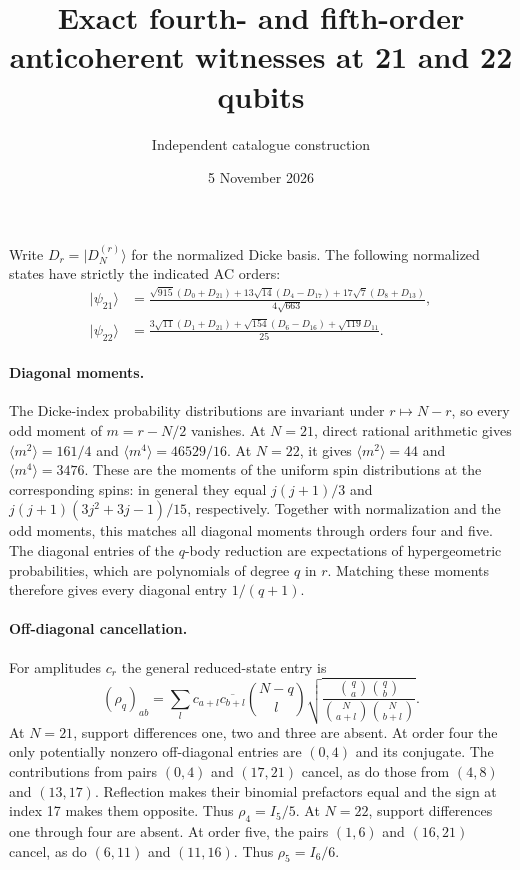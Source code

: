 \documentclass[11pt]{article}
\begin{document}
\title{Exact fourth- and fifth-order anticoherent witnesses at 21 and 22 qubits}
\author{Independent catalogue construction}
\date{5 November 2026}
\maketitle
Write $D_r=|D_N^{(r)}\rangle$ for the normalized Dicke basis.
The following normalized states have strictly the indicated AC orders:
\begin{align*}
|\psi_{21}\rangle&=\frac{\sqrt{915}(D_0+D_{21})+
 13\sqrt{14}(D_4-D_{17})+17\sqrt7(D_8+D_{13})}{4\sqrt{663}},\\
|\psi_{22}\rangle&=\frac{3\sqrt{11}(D_1+D_{21})+
 \sqrt{154}(D_6-D_{16})+\sqrt{119}D_{11}}{25}.
\end{align*}

\paragraph{Diagonal moments.}
The Dicke-index probability distributions are invariant under $r\mapsto N-r$,
so every odd moment of $m=r-N/2$ vanishes. At $N=21$, direct rational arithmetic
gives $\langle m^2\rangle=161/4$ and
$\langle m^4\rangle=46529/16$. At $N=22$, it gives
$\langle m^2\rangle=44$ and $\langle m^4\rangle=3476$.
These are the moments of the uniform spin distributions at the corresponding
spins: in general they equal $j(j+1)/3$ and
$j(j+1)(3j^2+3j-1)/15$, respectively. Together with normalization and the odd
moments, this matches all diagonal moments through orders four and five.
The diagonal entries of the $q$-body reduction are expectations of
hypergeometric probabilities, which are polynomials of degree $q$ in $r$.
Matching these moments therefore gives every diagonal entry $1/(q+1)$.

\paragraph{Off-diagonal cancellation.}
For amplitudes $c_r$ the general reduced-state entry is
\[
(\rho_q)_{ab}=\sum_l c_{a+l}\overline{c_{b+l}}
 \binom{N-q}{l}
 \sqrt{\frac{\binom qa\binom qb}
 {\binom N{a+l}\binom N{b+l}}}.
\]
At $N=21$, support differences one, two and three are absent.
At order four the only potentially nonzero off-diagonal entries are $(0,4)$
and its conjugate. The contributions from pairs $(0,4)$ and $(17,21)$ cancel,
as do those from $(4,8)$ and $(13,17)$. Reflection makes their binomial
prefactors equal and the sign at index 17 makes them opposite.
Thus $\rho_4=I_5/5$.
At $N=22$, support differences one through four are absent. At order five,
the pairs $(1,6)$ and $(16,21)$ cancel, as do $(6,11)$ and $(11,16)$.
Thus $\rho_5=I_6/6$.
\end{document}

